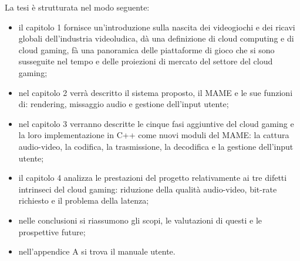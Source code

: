
La tesi è strutturata nel modo seguente:
\begin{itemize}
	\item il capitolo 1 fornisce un'introduzione sulla nascita dei videogiochi e dei ricavi globali dell'industria videoludica, dà una definizione di cloud computing e di cloud gaming, fà una panoramica delle piattaforme di gioco che si sono susseguite nel tempo e delle proiezioni di mercato del settore del cloud gaming;
	\item nel capitolo 2 verrà descritto il sistema proposto, il MAME e le sue funzioni di: rendering, missaggio audio e gestione dell'input utente;
	\item nel capitolo 3 verranno descritte le cinque fasi aggiuntive del cloud gaming e la loro implementazione in C++ come nuovi moduli del MAME: la cattura audio-video, la codifica, la trasmissione, la decodifica e la gestione dell'input utente;
	\item il capitolo 4 analizza le prestazioni del progetto relativamente ai tre difetti intrinseci del cloud gaming: riduzione della qualità audio-video, bit-rate richiesto e il problema della latenza;
	\item nelle conclusioni si riassumono gli scopi, le valutazioni di questi e le prospettive future;
	\item nell'appendice A si trova il manuale utente.
\end{itemize}